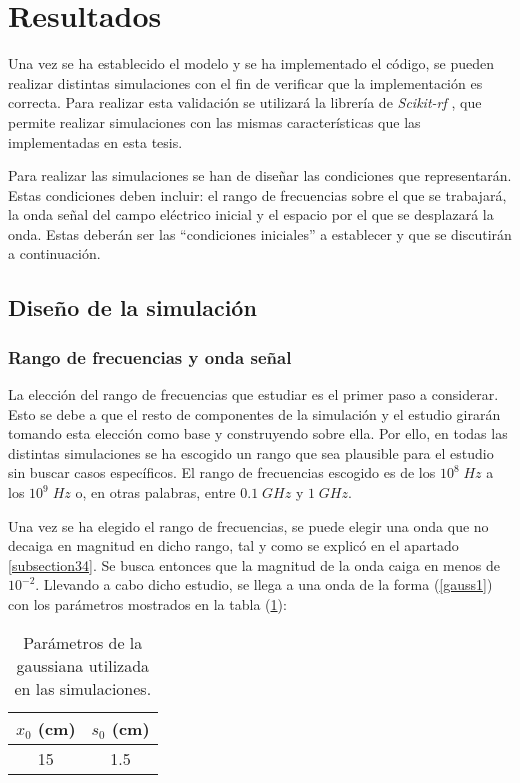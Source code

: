 \documentclass[11pt,a4paper,twoside,pdf]{article}
\numberwithin{equation}{section}
\begin{document}
\section{Resultados} \label{resultados}

Una vez se ha establecido el modelo y se ha implementado el código, se pueden realizar distintas simulaciones con el fin de verificar que la implementación es correcta. Para realizar esta validación se utilizará la librería de \textit{Scikit-rf} \cite{scikit}, que permite realizar simulaciones con las mismas características que las implementadas en esta tesis.

Para realizar las simulaciones se han de diseñar las condiciones que representarán. Estas condiciones deben incluir: el rango de frecuencias sobre el que se trabajará, la onda señal del campo eléctrico inicial y el espacio por el que se desplazará la onda. Estas deberán ser las ``condiciones iniciales'' a establecer y que se discutirán a continuación.
\subsection{Diseño de la simulación}
\subsubsection{Rango de frecuencias y onda señal}
La elección del rango de frecuencias que estudiar es el primer paso a considerar. Esto se debe a que el resto de componentes de la simulación y el estudio girarán tomando esta elección como base y construyendo sobre ella. Por ello, en todas las distintas simulaciones se ha escogido un rango que sea plausible para el estudio sin buscar casos específicos. El rango de frecuencias escogido es de los $10^8 \;Hz$ a los $10^9 \;Hz$ o, en otras palabras, entre $0.1\;GHz$ y $1 \;GHz$.

Una vez se ha elegido el rango de frecuencias, se puede elegir una onda que no decaiga en magnitud en dicho rango, tal y como se explicó en el apartado \ref{subsection34}. Se busca entonces que la magnitud de la onda caiga en menos de $10^{-2}$. Llevando a cabo dicho estudio, se llega a una onda de la forma (\ref{gauss1}) con los parámetros mostrados en la tabla (\ref{tab1}):
\begin{table}[h]
\centering
\begin{tabular}{|c|c|}
\hline
\textbf{$x_0$ (cm)} & \textbf{$s_0$ (cm)} \\ \hline
15                  & 1.5                 \\ \hline
\end{tabular}
\caption{Parámetros de la gaussiana utilizada en las simulaciones.}
\label{tab1}
\end{table}
\end{document}
